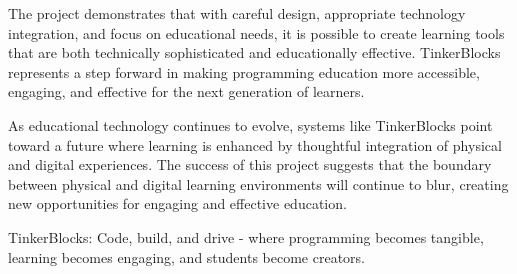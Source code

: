The project demonstrates that with careful design, appropriate technology integration, and focus on educational needs, it is possible to create learning tools that are both technically sophisticated and educationally effective. TinkerBlocks represents a step forward in making programming education more accessible, engaging, and effective for the next generation of learners.

As educational technology continues to evolve, systems like TinkerBlocks point toward a future where learning is enhanced by thoughtful integration of physical and digital experiences. The success of this project suggests that the boundary between physical and digital learning environments will continue to blur, creating new opportunities for engaging and effective education.

TinkerBlocks: Code, build, and drive - where programming becomes tangible, learning becomes engaging, and students become creators.